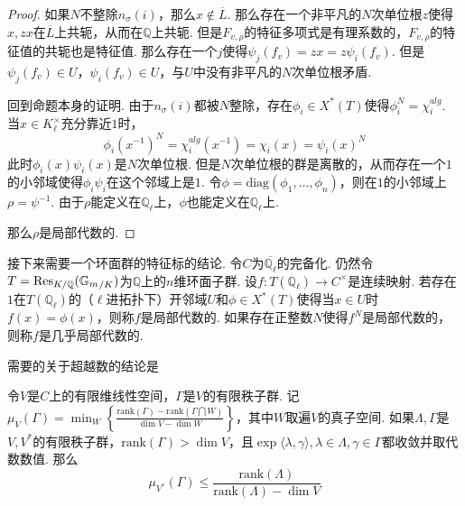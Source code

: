 \begin{proof}
    如果$N$不整除$n_{\sigma}(i)$，那么$x\not\in \overline{L}$. 那么存在一个非平凡的$N$次单位根$z$使得$x, zx$在$\overline{L}$上共轭，从而在$\mathbb{Q}$上共轭. 但是$F_{v,\rho}$的特征多项式是有理系数的，$F_{v,\rho}$的特征值的共轭也是特征值. 那么存在一个$j$使得$\psi_j(f_v) = zx = z\psi_i(f_v)$. 但是$\psi_j(f_v)\in U$，$\psi_i(f_v)\in U$，与$U$中没有非平凡的$N$次单位根矛盾.

    \vskip0.3cm

    回到命题本身的证明. 由于$n_{\sigma}(i)$都被$N$整除，存在$\phi_i\in X^{*}(T)$使得$\phi_i^N = \chi_i^{alg}$. 当$x\in K_{\ell}^{\times}$充分靠近$1$时，
    \begin{equation}
        \phi_i(x^{-1})^N = \chi_i^{alg}(x^{-1}) = \chi_i(x) = \psi_i(x)^N
    \end{equation}
    此时$\phi_i(x)\psi_i(x)$是$N$次单位根. 但是$N$次单位根的群是离散的，从而存在一个$1$的小邻域使得$\phi_i\psi_i$在这个邻域上是$1$. 令$\phi=\mathrm{diag}(\phi_1,\ldots,\phi_n)$，则在$1$的小邻域上$\rho = \psi^{-1}$. 由于$\rho$能定义在$\mathbb{Q}_{\ell}$上，$\phi$也能定义在$\mathbb{Q}_{\ell}$上.

    那么$\rho$是局部代数的.
\end{proof}

接下来需要一个环面群的特征标的结论.
令$C$为$\overline{\mathbb{Q}_{\ell}}$的完备化. 仍然令$T=\mathrm{Res}_{K/\mathbb{Q}}({\mathbb{G}_m}_{/K})$为$\mathbb{Q}$上的$n$维环面子群.
设$f: T(\mathbb{Q}_{\ell})\to C^{\times}$是连续映射. 若存在$1$在$T(\mathbb{Q}_{\ell})$的（$\ell$进拓扑下）开邻域$U$和$\phi\in X^{*}(T)$使得当$x\in U$时$f(x)=\phi(x)$，则称$f$是局部代数的. 如果存在正整数$N$使得$f^N$是局部代数的，则称$f$是几乎局部代数的.

需要的关于超越数的结论是
\begin{cprop}
    令$V$是$C$上的有限维线性空间，$\Gamma$是$V$的有限秩子群. 记$\mu_{V}(\Gamma) = \min_W \left\{ \frac{\mathrm{rank}(\Gamma) - \mathrm{rank}(\Gamma \bigcap W)}{\dim V-\dim W} \right\}$，其中$W$取遍$V$的真子空间. 如果$\Lambda, \Gamma$是$V, V^{*}$的有限秩子群，$\mathrm{rank}(\Gamma)>\dim V$，且$\exp\langle \lambda, \gamma\rangle, \lambda \in \Lambda, \gamma\in \Gamma$都收敛并取代数数值. 那么
    \begin{equation}
        \mu_{V^{*}}(\Gamma)\leq \frac{\mathrm{rank}(\Lambda)}{\mathrm{rank}(\Lambda) - \dim V}
    \end{equation}\label{temp::theo8}
\end{cprop}

